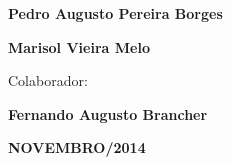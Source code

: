 \documentclass[12pt]{article}
\begin{document}
\begin{Center}
{\fontsize{20pt}{24.0pt}\selectfont \textbf{Pedro Augusto Pereira Borges}\par}
\end{Center}\par

\begin{Center}
{\fontsize{20pt}{24.0pt}\selectfont \textbf{Marisol Vieira Melo}\par}
\end{Center}\par


\vspace{\baselineskip}
\begin{Center}
{\fontsize{14pt}{16.8pt}\selectfont Colaborador:\par}
\end{Center}\par

\begin{Center}
{\fontsize{20pt}{24.0pt}\selectfont \textbf{Fernando Augusto Brancher}\par}
\end{Center}\par


\vspace{\baselineskip}

\vspace{\baselineskip}
\begin{Center}
\textbf{NOVEMBRO/2014}
\end{Center}\par
\end{document}
